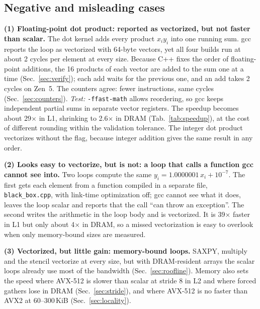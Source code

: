 \documentclass{article}
\begin{document}
\subsection{Negative and misleading cases}\label{sec:neg}
\textbf{(1) Floating-point dot product: reported as vectorized, but not faster than scalar.} The dot kernel adds every product $x_i y_i$ into one running sum. gcc reports the loop as vectorized with 64-byte vectors, yet all four builds run at about 2 cycles per element at every size. Because C++ fixes the order of floating-point additions, the 16 products of each vector are added to the sum one at a time (Sec.~\ref{sec:verify}); each add waits for the previous one, and an add takes 2 cycles on Zen~5. The counters agree: fewer instructions, same cycles (Sec.~\ref{sec:counters}). \emph{Test:} \texttt{-ffast-math} \cite{gccdoc} allows reordering, so gcc keeps independent partial sums in separate vector registers. The speedup becomes about 29$\times$ in L1, shrinking to 2.6$\times$ in DRAM (Tab.~\ref{tab:speedup}), at the cost of different rounding within the validation tolerance. The integer dot product vectorizes without the flag, because integer addition gives the same result in any order.

\textbf{(2) Looks easy to vectorize, but is not: a loop that calls a function gcc cannot see into.} Two loops compute the same $y_i = 1.0000001\,x_i + 10^{-7}$. The first gets each element from a function compiled in a separate file, \texttt{black\_box.cpp}, with link-time optimization off; gcc cannot see what it does, leaves the loop scalar and reports that the call ``can throw an exception''. The second writes the arithmetic in the loop body and is vectorized. It is 39$\times$ faster in L1 but only about 4$\times$ in DRAM, so a missed vectorization is easy to overlook when only memory-bound sizes are measured.

\textbf{(3) Vectorized, but little gain: memory-bound loops.} SAXPY, multiply and the stencil vectorize at every size, but with DRAM-resident arrays the scalar loops already use most of the bandwidth (Sec.~\ref{sec:roofline}). Memory also sets the speed where AVX-512 is slower than scalar at stride 8 in L2 and where forced gathers lose in DRAM (Sec.~\ref{sec:stride}), and where AVX-512 is no faster than AVX2 at 60--300\,KiB (Sec.~\ref{sec:locality}).
\end{document}
